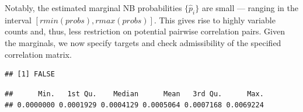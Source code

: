 \documentclass{article}
\newenvironment{Shaded}{\begin{snugshade}}{\end{snugshade}}
\newcommand{\AttributeTok}[1]{\textcolor[rgb]{0.77,0.63,0.00}{#1}}
\newcommand{\CommentTok}[1]{\textcolor[rgb]{0.56,0.35,0.01}{\textit{#1}}}
\newcommand{\ConstantTok}[1]{\textcolor[rgb]{0.00,0.00,0.00}{#1}}
\newcommand{\ControlFlowTok}[1]{\textcolor[rgb]{0.13,0.29,0.53}{\textbf{#1}}}
\newcommand{\DocumentationTok}[1]{\textcolor[rgb]{0.56,0.35,0.01}{\textbf{\textit{#1}}}}
\newcommand{\FunctionTok}[1]{\textcolor[rgb]{0.00,0.00,0.00}{#1}}
\newcommand{\NormalTok}[1]{#1}
\newcommand{\OtherTok}[1]{\textcolor[rgb]{0.56,0.35,0.01}{#1}}
\newcommand{\SpecialCharTok}[1]{\textcolor[rgb]{0.00,0.00,0.00}{#1}}
\begin{document}
Notably, the estimated marginal NB probabilities \(\{ \hat{p}_i \}\) are
small --- ranging in the interval \([r min(probs) , r max(probs)]\).
This gives rise to highly variable counts and, thus, less restriction on
potential pairwise correlation pairs. Given the marginals, we now
specify targets and check admissibility of the specified correlation
matrix.

\begin{Shaded}
\end{Shaded}

\begin{verbatim}
## [1] FALSE
\end{verbatim}

\begin{Shaded}
\end{Shaded}

\begin{verbatim}
##      Min.   1st Qu.    Median      Mean   3rd Qu.      Max. 
## 0.0000000 0.0001929 0.0004129 0.0005064 0.0007168 0.0069224
\end{verbatim}
\end{document}
